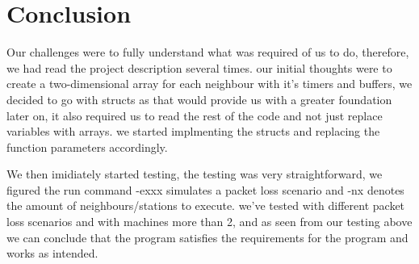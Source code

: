 \section{Conclusion}
Our challenges were to fully understand what was required of us to do, therefore, we had read the project description several times.
our initial thoughts were to create a two-dimensional array for each neighbour with it's timers and buffers, we decided to go with structs as
that would provide us with a greater foundation later on, it also required us to read the rest of the code and not just replace variables with arrays.
we started implmenting the structs and replacing the function parameters accordingly.

We then imidiately started testing, the testing was very straightforward,
we figured the run command -exxx simulates a packet loss scenario and -nx denotes the amount of neighbours/stations to execute.
we've tested with different packet loss scenarios and with machines more than 2,
and as seen from our testing above we can conclude that the program satisfies the requirements for the program and works as intended.
